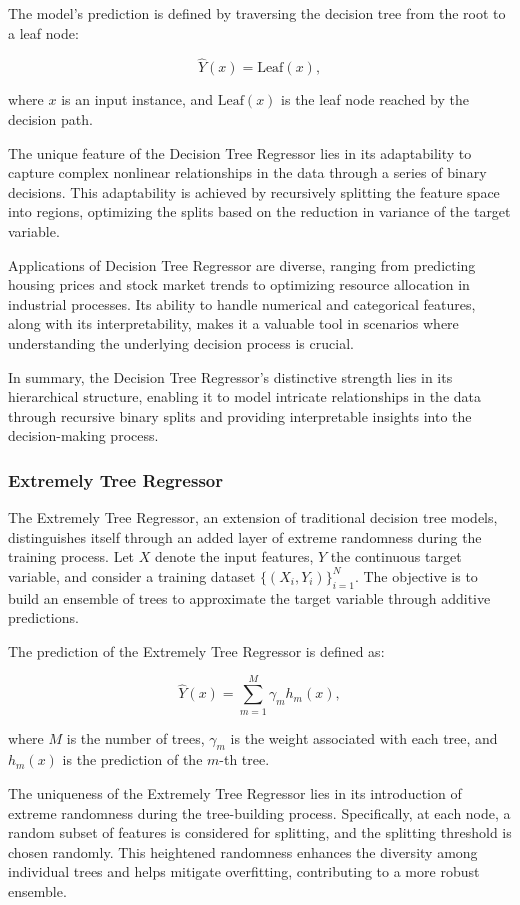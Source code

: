 \documentclass[twocolumn]{article}
\begin{document}
The model's prediction is defined by traversing the decision tree from the root to a leaf node:

\[ \hat{Y}(x) = \text{Leaf}(x), \]

where \(x\) is an input instance, and \(\text{Leaf}(x)\) is the leaf node reached by the decision path.

The unique feature of the Decision Tree Regressor lies in its adaptability to capture complex nonlinear relationships in the data through a series of binary decisions. This adaptability is achieved by recursively splitting the feature space into regions, optimizing the splits based on the reduction in variance of the target variable.

Applications of Decision Tree Regressor are diverse, ranging from predicting housing prices and stock market trends to optimizing resource allocation in industrial processes. Its ability to handle numerical and categorical features, along with its interpretability, makes it a valuable tool in scenarios where understanding the underlying decision process is crucial.

In summary, the Decision Tree Regressor's distinctive strength lies in its hierarchical structure, enabling it to model intricate relationships in the data through recursive binary splits and providing interpretable insights into the decision-making process.

		\subsubsection{Extremely Tree Regressor}
The Extremely Tree Regressor, an extension of traditional decision tree models, distinguishes itself through an added layer of extreme randomness during the training process. Let \(X\) denote the input features, \(Y\) the continuous target variable, and consider a training dataset \(\{(X_i, Y_i)\}_{i=1}^{N}\). The objective is to build an ensemble of trees to approximate the target variable through additive predictions.

The prediction of the Extremely Tree Regressor is defined as:

\[ \hat{Y}(x) = \sum_{m=1}^{M} \gamma_m h_m(x), \]

where \(M\) is the number of trees, \(\gamma_m\) is the weight associated with each tree, and \(h_m(x)\) is the prediction of the \(m\)-th tree.

The uniqueness of the Extremely Tree Regressor lies in its introduction of extreme randomness during the tree-building process. Specifically, at each node, a random subset of features is considered for splitting, and the splitting threshold is chosen randomly. This heightened randomness enhances the diversity among individual trees and helps mitigate overfitting, contributing to a more robust ensemble.
\end{document}
